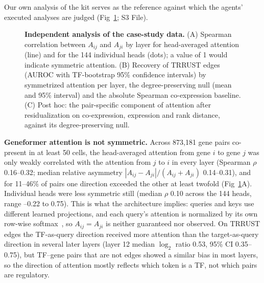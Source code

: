 \documentclass[10pt,letterpaper]{article}
\begin{document}
Our own analysis of the kit serves as the reference against which the agents' executed analyses are judged (Fig~\ref{fig5}; S3 File).

\begin{figure}[!h]
\caption{{\bf Independent analysis of the case-study data.}
(A) Spearman correlation between $A_{ij}$ and $A_{ji}$ by layer for head-averaged attention (line) and for the 144 individual heads (dots); a value of 1 would indicate symmetric attention. (B) Recovery of TRRUST edges (AUROC with TF-bootstrap 95\% confidence intervals) by symmetrized attention per layer, the degree-preserving null (mean and 95\% interval) and the absolute Spearman co-expression baseline. (C) Post hoc: the pair-specific component of attention after residualization on co-expression, expression and rank distance, against its degree-preserving null.}
\label{fig5}
\end{figure}

\textbf{Geneformer attention is not symmetric.} Across 873,181 gene pairs co-present in at least 50 cells, the head-averaged attention from gene $i$ to gene $j$ was only weakly correlated with the attention from $j$ to $i$ in every layer (Spearman $\rho$ 0.16--0.32; median relative asymmetry $|A_{ij}-A_{ji}|/(A_{ij}+A_{ji})$ 0.14--0.31), and for 11--46\% of pairs one direction exceeded the other at least twofold (Fig~\ref{fig5}A). Individual heads were less symmetric still (median $\rho$ 0.10 across the 144 heads, range --0.22 to 0.75). This is what the architecture implies: queries and keys use different learned projections, and each query's attention is normalized by its own row-wise softmax~\cite{vaswani2017attention,tsai2019dissection}, so $A_{ij}=A_{ji}$ is neither guaranteed nor observed. On TRRUST edges the TF-as-query direction received more attention than the target-as-query direction in several later layers (layer 12 median $\log_2$ ratio 0.53, 95\% CI 0.35--0.75), but TF--gene pairs that are not edges showed a similar bias in most layers, so the direction of attention mostly reflects which token is a TF, not which pairs are regulatory.
\end{document}
